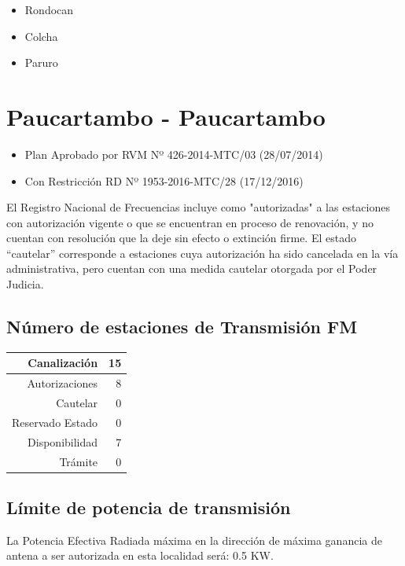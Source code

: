 \documentclass[11pt]{article}
\begin{document}
\begin{itemize}
	\item Rondocan
	\item Colcha
	\item Paruro
\end{itemize}



\section{Paucartambo - Paucartambo}

\begin{itemize}
	\item Plan Aprobado por RVM Nº 426-2014-MTC/03 (28/07/2014)
	\item Con Restricción RD Nº 1953-2016-MTC/28 (17/12/2016)
\end{itemize}

El Registro Nacional de Frecuencias incluye como "autorizadas" a las estaciones con autorización vigente o que se encuentran en proceso de renovación, y no cuentan con resolución que la deje sin efecto o extinción firme. El estado “cautelar” corresponde a estaciones cuya autorización ha sido cancelada en la vía administrativa, pero cuentan con una medida cautelar otorgada por el Poder Judicia.

\subsection{Número de estaciones de Transmisión FM}

\begin{tabular}{|r|r|} \hline
	Canalización 			& 15 \\ \hline
	Autorizaciones			& 8 \\ \hline
	Cautelar				& 0 \\ \hline
	Reservado Estado		& 0 \\ \hline
	Disponibilidad			& 7 \\ \hline
	Trámite					& 0 \\ \hline 
\end{tabular}

\subsection{Límite de potencia de transmisión}

La Potencia Efectiva Radiada máxima en la dirección de máxima ganancia de antena a ser autorizada en esta localidad será: 0.5 KW.
\end{document}

